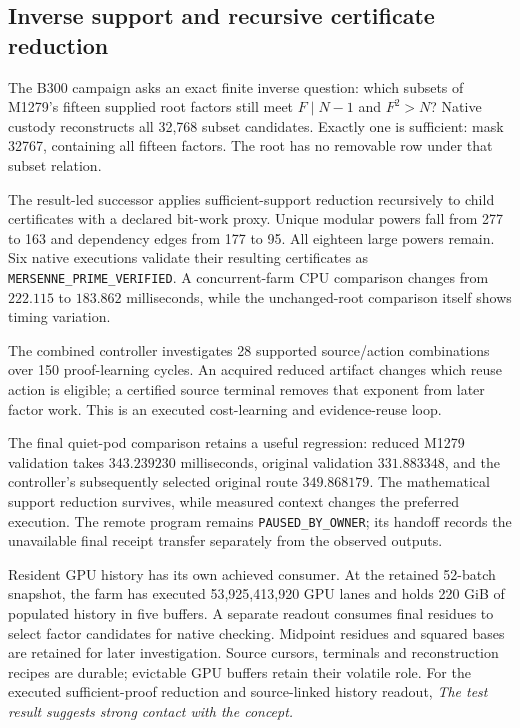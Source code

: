 \subsection{Inverse support and recursive certificate reduction}

The B300 campaign asks an exact finite inverse question:
which subsets of M1279's fifteen supplied root factors still
meet \(F\mid N-1\) and \(F^2>N\)? Native custody reconstructs
all 32,768 subset candidates. Exactly one is sufficient:
mask 32767, containing all fifteen factors. The root has
no removable row under that subset relation.

The result-led successor applies sufficient-support reduction
recursively to child certificates with a declared bit-work
proxy. Unique modular powers fall from 277 to 163 and
dependency edges from 177 to 95. All eighteen large powers
remain. Six native executions validate their resulting
certificates as \texttt{MERSENNE\_PRIME\_VERIFIED}.
A concurrent-farm CPU comparison changes from \(222.115\)
to \(183.862\) milliseconds, while the unchanged-root
comparison itself shows timing variation.

The combined controller investigates 28 supported
source/action combinations over 150 proof-learning cycles.
An acquired reduced artifact changes which reuse action
is eligible; a certified source terminal removes that
exponent from later factor work. This is an executed
cost-learning and evidence-reuse loop.

The final quiet-pod comparison retains a useful regression:
reduced M1279 validation takes \(343.239230\)
milliseconds, original validation \(331.883348\), and the
controller's subsequently selected original route
\(349.868179\). The mathematical support reduction
survives, while measured context changes the preferred
execution. The remote program remains
\texttt{PAUSED\_BY\_OWNER}; its handoff records the
unavailable final receipt transfer separately from the
observed outputs.

Resident GPU history has its own achieved consumer.
At the retained 52-batch snapshot, the farm has executed
53,925,413,920 GPU lanes and holds 220 GiB of populated
history in five buffers. A separate readout consumes
final residues to select factor candidates for native
checking. Midpoint residues and squared bases are
retained for later investigation. Source cursors,
terminals and reconstruction recipes are durable;
evictable GPU buffers retain their volatile role.
For the executed sufficient-proof reduction and source-linked
history readout, \emph{The test result suggests strong
contact with the concept.}

